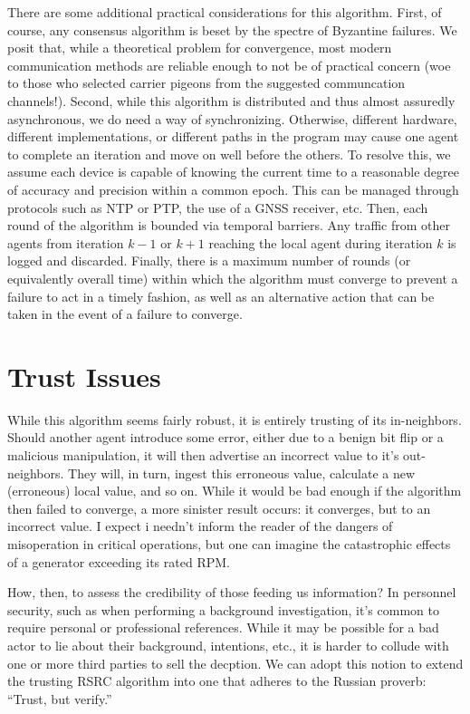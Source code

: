 \documentclass[11pt]{article}
\begin{document}
There are some additional practical considerations for this algorithm. First, of
course, any consensus algorithm is beset by the spectre  of Byzantine failures.
We posit that, while a theoretical problem for convergence, most modern
communication methods are reliable enough to not be of practical concern (woe to
those who selected carrier pigeons from the suggested communcation channels!).
Second, while this algorithm is distributed and thus almost assuredly
asynchronous, we do need a way of synchronizing. Otherwise, different hardware,
different implementations, or different paths in the program may cause one agent
to complete an iteration and move on well before the others. To resolve this, we
assume each device is capable of knowing the current time to a reasonable degree
of accuracy and precision within a common epoch. This can be managed through
protocols such as NTP or PTP, the use of a GNSS receiver, etc. Then, each round
of the algorithm is bounded via temporal barriers. Any traffic from other agents
from iteration $k-1$ or $k+1$ reaching the local agent during iteration $k$ is
logged and discarded. Finally, there is a maximum number of rounds (or
equivalently overall time) within which the algorithm must converge to prevent a
failure to act in a timely fashion, as well as an alternative action that can be
taken in the event of a failure to converge.

\section{Trust Issues}
While this algorithm seems fairly robust, it is entirely trusting of its
in-neighbors.  Should another agent introduce some error, either due to a benign
bit flip or a malicious manipulation, it will then advertise an incorrect value
to it's out-neighbors. They will, in turn, ingest this erroneous value,
calculate a new (erroneous) local value, and so on.  While it would be bad
enough if the algorithm then failed to converge, a more sinister result occurs:
it converges, but to an incorrect value. I expect i needn't inform the reader of
the dangers of misoperation in critical operations, but one can imagine the
catastrophic effects of a generator exceeding its rated RPM.

How, then, to assess the credibility of those feeding us information? In
personnel security, such as when performing a background investigation, it's
common to require personal or professional references. While it may be possible
for a bad actor to lie about their background, intentions, etc., it is harder to
collude with one or more third parties to sell the decption. We can adopt this
notion to extend the trusting RSRC algorithm into one that adheres to the
Russian proverb: ``Trust, but verify.''
\end{document}
